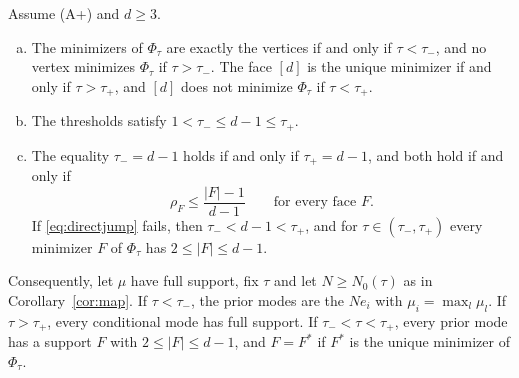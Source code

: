 \begin{proposition}[thresholds]\label{prop:thresholds}
Assume \textup{(A+)} and $d\ge3$.
\begin{enumerate}[(a)]
\item The minimizers of $\Phi_\tau$ are exactly the vertices if and only if
$\tau<\tau_-$, and no vertex minimizes $\Phi_\tau$ if $\tau>\tau_-$. The face
$[d]$ is the unique minimizer if and only if $\tau>\tau_+$, and $[d]$ does not
minimize $\Phi_\tau$ if $\tau<\tau_+$.
\item The thresholds satisfy $1<\tau_-\le d-1\le\tau_+$.
\item The equality $\tau_-=d-1$ holds if and only if $\tau_+=d-1$, and both hold if and only if
\begin{equation}\label{eq:directjump}
 \rho_F\le\frac{|F|-1}{d-1}\qquad\text{for every face } F.
\end{equation}
If \eqref{eq:directjump} fails, then $\tau_-<d-1<\tau_+$, and for
$\tau\in(\tau_-,\tau_+)$ every minimizer $F$ of $\Phi_\tau$ has
$2\le|F|\le d-1$.
\end{enumerate}
Consequently, let $\mu$ have full support, fix $\tau$ and let $N\ge N_0(\tau)$
as in Corollary~\ref{cor:map}. If $\tau<\tau_-$, the prior
modes are the $Ne_i$ with $\mu_i=\max_l\mu_l$. If $\tau>\tau_+$, every
conditional mode has full support. If $\tau_-<\tau<\tau_+$, every prior
mode has a support $F$ with $2\le|F|\le d-1$, and $F=F^*$ if $F^*$ is
the unique minimizer of $\Phi_\tau$.
\end{proposition}

